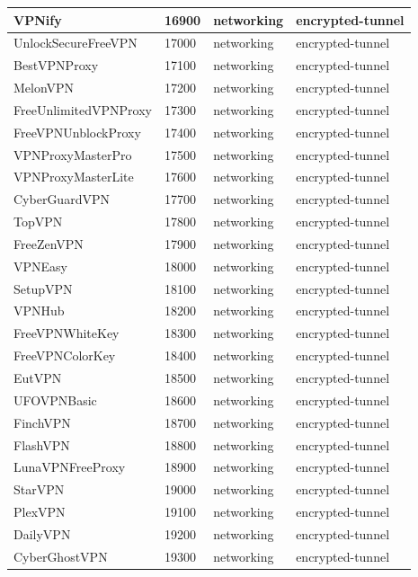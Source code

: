 \begin{longtable}{p{}|p{}|p{}|p{}}
    VPNify &	16900 &	networking &	encrypted-tunnel \\ \hline
    UnlockSecureFreeVPN &	17000 &	networking &	encrypted-tunnel \\ \hline
    BestVPNProxy &	17100 &	networking &	encrypted-tunnel \\ \hline
    MelonVPN &	17200 &	networking &	encrypted-tunnel \\ \hline
    FreeUnlimitedVPNProxy &	17300 &	networking &	encrypted-tunnel \\ \hline
    FreeVPNUnblockProxy &	17400 &	networking &	encrypted-tunnel \\ \hline
    VPNProxyMasterPro &	17500 &	networking &	encrypted-tunnel \\ \hline
    VPNProxyMasterLite &	17600 &	networking &	encrypted-tunnel \\ \hline
    CyberGuardVPN &	17700 &	networking &	encrypted-tunnel \\ \hline
    TopVPN &	17800 &	networking &	encrypted-tunnel \\ \hline
    FreeZenVPN &	17900 &	networking &	encrypted-tunnel \\ \hline
    VPNEasy &	18000 &	networking &	encrypted-tunnel \\ \hline
    SetupVPN &	18100 &	networking &	encrypted-tunnel \\ \hline
    VPNHub &	18200 &	networking &	encrypted-tunnel \\ \hline
    FreeVPNWhiteKey &	18300 &	networking &	encrypted-tunnel \\ \hline
    FreeVPNColorKey &	18400 &	networking &	encrypted-tunnel \\ \hline
    EutVPN &	18500 &	networking &	encrypted-tunnel \\ \hline
    UFOVPNBasic &	18600 &	networking &	encrypted-tunnel \\ \hline
    FinchVPN &	18700 &	networking &	encrypted-tunnel \\ \hline
    FlashVPN &	18800 &	networking &	encrypted-tunnel \\ \hline
    LunaVPNFreeProxy &	18900 &	networking &	encrypted-tunnel \\ \hline
    StarVPN &	19000 &	networking &	encrypted-tunnel \\ \hline
    PlexVPN &	19100 &	networking &	encrypted-tunnel \\ \hline
    DailyVPN &	19200 &	networking &	encrypted-tunnel \\ \hline
    CyberGhostVPN &	19300 &	networking &	encrypted-tunnel \\ \hline

\end{longtable}
